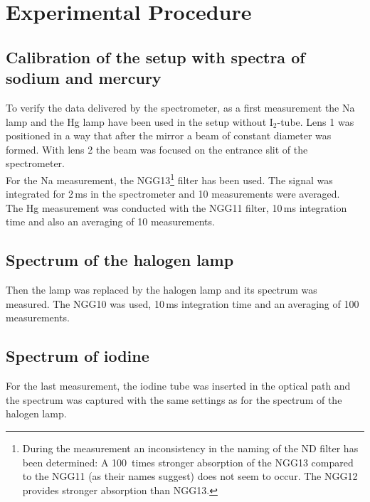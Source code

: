 \section{Experimental Procedure}

\subsection{Calibration of the setup with spectra of sodium and mercury}
To verify the data delivered by the spectrometer, as a first measurement the Na lamp and the Hg lamp
have been used in the setup without I$_2$-tube.
Lens 1 was positioned in a way that after the mirror a beam of constant diameter was formed.
With lens 2 the beam was focused on the entrance slit of the spectrometer.\\
For the Na measurement, the NGG13\footnote{During
the measurement an inconsistency in the naming of the ND filter has been determined:
A 100~times stronger absorption of the NGG13 compared to the NGG11 (as their names suggest) does not seem to occur.
The NGG12 provides stronger absorption than NGG13.}
filter has been used.
The signal was integrated for 2\,ms in the spectrometer and 10 measurements were averaged.\\
The Hg measurement was conducted with the NGG11 filter,
10\,ms integration time and also an averaging of 10 measurements.

\subsection{Spectrum of the halogen lamp}
Then the lamp was replaced by the halogen lamp and its spectrum was measured.
The NGG10 was used, 10\,ms integration time and an averaging of 100 measurements.

\subsection{Spectrum of iodine}
For the last measurement, the iodine tube was inserted in the optical path and the spectrum was captured
with the same settings as for the spectrum of the halogen lamp.